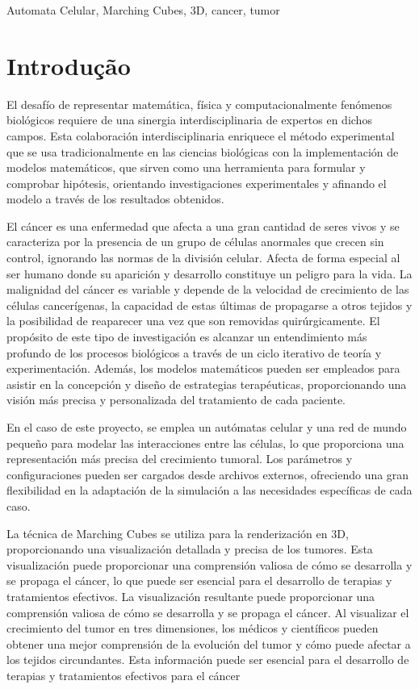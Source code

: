 \documentclass[a4paper,11pt]{article}
\begin{document}
{{\vskip 0.2cm  %


{\small{ %
 Automata Celular, Marching Cubes, 3D, cancer, tumor
}}
}


\section*{Introdução}

El desafío de representar matemática, física y computacionalmente fenómenos biológicos requiere de una sinergia interdisciplinaria de expertos en dichos campos. Esta colaboración interdisciplinaria enriquece el método experimental que se usa tradicionalmente en las ciencias biológicas con la implementación de modelos matemáticos, que sirven como una herramienta para formular y comprobar hipótesis, orientando investigaciones experimentales y afinando el modelo a través de los resultados obtenidos.~\cite{2}

El cáncer es una enfermedad que afecta a una gran cantidad de seres vivos y se caracteriza por la presencia de un grupo de células anormales que crecen sin control, ignorando las normas de la división celular. Afecta de forma especial al ser humano donde su aparición y desarrollo constituye un peligro para la vida. La malignidad del cáncer es variable y depende de la velocidad de crecimiento de las células cancerígenas, la capacidad de estas últimas de propagarse a otros tejidos y la posibilidad de reaparecer una vez que son removidas quirúrgicamente.
El propósito de este tipo de investigación es alcanzar un entendimiento más profundo de los procesos biológicos a través de un ciclo iterativo de teoría y experimentación. Además, los modelos matemáticos pueden ser empleados para asistir en la concepción y diseño de estrategias terapéuticas, proporcionando una visión más precisa y personalizada del tratamiento de cada paciente.

En el caso de este proyecto, se emplea un autómatas celular y una red de mundo pequeño para modelar las interacciones entre las células, lo que proporciona una representación más precisa del crecimiento tumoral. Los parámetros y configuraciones pueden ser cargados desde archivos externos, ofreciendo una gran flexibilidad en la adaptación de la simulación a las necesidades específicas de cada caso.

La técnica de Marching Cubes se utiliza para la renderización en 3D, proporcionando una visualización detallada y precisa de los tumores. Esta visualización puede proporcionar una comprensión valiosa de cómo se desarrolla y se propaga el cáncer, lo que puede ser esencial para el desarrollo de terapias y tratamientos efectivos. La visualización resultante puede proporcionar una comprensión valiosa de cómo se desarrolla y se propaga el cáncer. Al visualizar el crecimiento del tumor en tres dimensiones, los médicos y científicos pueden obtener una mejor comprensión de la evolución del tumor y cómo puede afectar a los tejidos circundantes. Esta información puede ser esencial para el desarrollo de terapias y tratamientos efectivos para el cáncer


}
\end{document}
